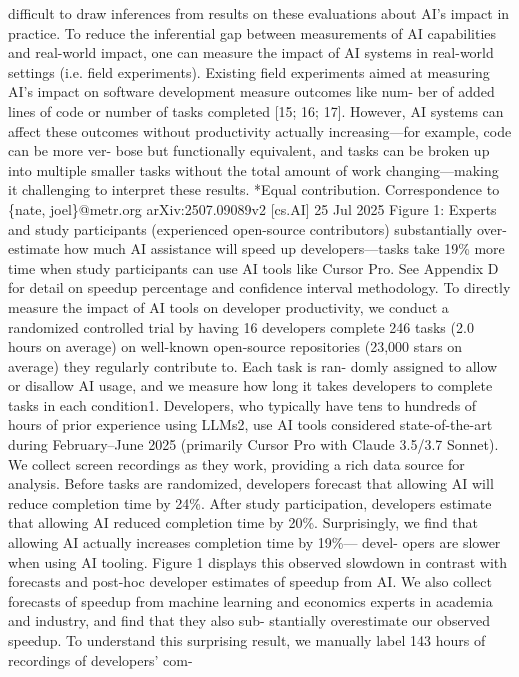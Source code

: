 difficult to draw inferences from results on these evaluations about AI’s impact in practice.
To reduce the inferential gap between measurements of AI capabilities and real-world impact, one
can measure the impact of AI systems in real-world settings (i.e. field experiments). Existing field
experiments aimed at measuring AI’s impact on software development measure outcomes like num-
ber of added lines of code or number of tasks completed [15; 16; 17]. However, AI systems can
affect these outcomes without productivity actually increasing—for example, code can be more ver-
bose but functionally equivalent, and tasks can be broken up into multiple smaller tasks without the
total amount of work changing—making it challenging to interpret these results.
*Equal contribution. Correspondence to \{nate, joel\}@metr.org
arXiv:2507.09089v2  [cs.AI]  25 Jul 2025
Figure 1: Experts and study participants (experienced open-source contributors) substantially over-
estimate how much AI assistance will speed up developers—tasks take 19\% more time when study
participants can use AI tools like Cursor Pro. See Appendix D for detail on speedup percentage and
confidence interval methodology.
To directly measure the impact of AI tools on developer productivity, we conduct a randomized
controlled trial by having 16 developers complete 246 tasks (2.0 hours on average) on well-known
open-source repositories (23,000 stars on average) they regularly contribute to. Each task is ran-
domly assigned to allow or disallow AI usage, and we measure how long it takes developers to
complete tasks in each condition1. Developers, who typically have tens to hundreds of hours of
prior experience using LLMs2, use AI tools considered state-of-the-art during February–June 2025
(primarily Cursor Pro with Claude 3.5/3.7 Sonnet). We collect screen recordings as they work,
providing a rich data source for analysis.
Before tasks are randomized, developers forecast that allowing AI will reduce completion time by
24\%. After study participation, developers estimate that allowing AI reduced completion time by
20\%. Surprisingly, we find that allowing AI actually increases completion time by 19\%— devel-
opers are slower when using AI tooling. Figure 1 displays this observed slowdown in contrast with
forecasts and post-hoc developer estimates of speedup from AI. We also collect forecasts of speedup
from machine learning and economics experts in academia and industry, and find that they also sub-
stantially overestimate our observed speedup.
To understand this surprising result, we manually label 143 hours of recordings of developers’ com-
